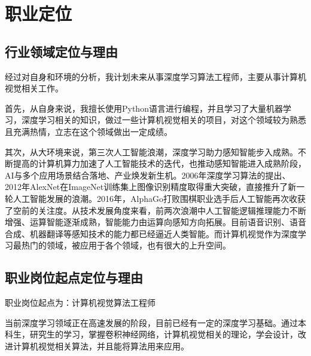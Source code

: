 \documentclass{article}
\begin{document}
\section{职业定位}

\subsection{行业领域定位与理由}
经过对自身和环境的分析，我计划未来从事深度学习算法工程师，主要从事计算机视觉相关工作。\par
首先，从自身来说，我擅长使用Python语言进行编程，并且学习了大量机器学习，深度学习相关的知识，做过一些计算机视觉相关的项目，对这个领域较为熟悉且充满热情，立志在这个领域做出一定成绩。\par
其次，从大环境来说，第三次人工智能浪潮，深度学习助力感知智能步入成熟。不断提高的计算机算力加速了人工智能技术的迭代，也推动感知智能进入成熟阶段，AI与多个应用场景结合落地、产业焕发新生机。2006年深度学习算法的提出、2012年AlexNet在ImageNet训练集上图像识别精度取得重大突破，直接推升了新一轮人工智能发展的浪潮。2016年，AlphaGo打败围棋职业选手后人工智能再次收获了空前的关注度。从技术发展角度来看，前两次浪潮中人工智能逻辑推理能力不断增强、运算智能逐渐成熟，智能能力由运算向感知方向拓展。目前语音识别、语音合成、机器翻译等感知技术的能力都已经逼近人类智能。而计算机视觉作为深度学习最热门的领域，被应用于各个领域，也有很大的上升空间。
\par
\subsection{职业岗位起点定位与理由}
职业岗位起点为：计算机视觉算法工程师\par
当前深度学习领域正在高速发展的阶段，目前已经有一定的深度学习基础。通过本科生，研究生的学习，掌握卷积神经网络，计算机视觉相关的理论，学会设计，改进计算机视觉相关算法，并且能将算法用来应用。
\par
\end{document}
